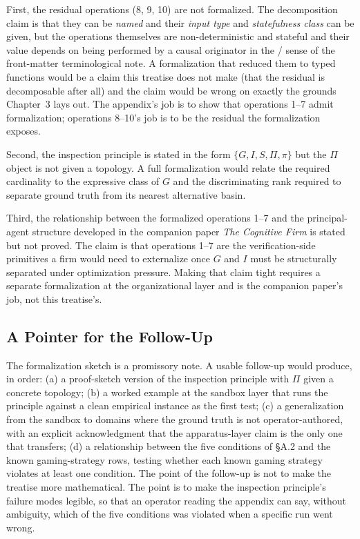 \documentclass[11pt]{article}
\begin{document}
First, the residual operations (8, 9, 10) are not formalized. The decomposition claim is that they can be \emph{named} and their \emph{input type} and \emph{statefulness class} can be given, but the operations themselves are non-deterministic and stateful and their value depends on being performed by a causal originator in the \citet{bandura1989} / \citet{ryan2000} sense of the front-matter terminological note. A formalization that reduced them to typed functions would be a claim this treatise does not make (that the residual is decomposable after all) and the claim would be wrong on exactly the grounds Chapter~3 lays out. The appendix's job is to show that operations 1--7 admit formalization; operations 8--10's job is to be the residual the formalization exposes.

Second, the inspection principle is stated in the form $\{G, I, S, \Pi, \pi\}$ but the $\Pi$ object is not given a topology. A full formalization would relate the required cardinality to the expressive class of $G$ and the discriminating rank required to separate ground truth from its nearest alternative basin.

Third, the relationship between the formalized operations 1--7 and the \citet{jensen1976} principal-agent structure developed in the companion paper \emph{The Cognitive Firm} is stated but not proved. The claim is that operations 1--7 are the verification-side primitives a firm would need to externalize once $G$ and $I$ must be structurally separated under optimization pressure. Making that claim tight requires a separate formalization at the organizational layer and is the companion paper's job, not this treatise's.

\subsection{A Pointer for the Follow-Up}

The formalization sketch is a promissory note. A usable follow-up would produce, in order: (a) a proof-sketch version of the inspection principle with $\Pi$ given a concrete topology; (b) a worked example at the sandbox layer that runs the principle against a clean empirical instance as the first test; (c) a generalization from the sandbox to domains where the ground truth is not operator-authored, with an explicit acknowledgment that the apparatus-layer claim is the only one that transfers; (d) a relationship between the five conditions of \S A.2 and the known gaming-strategy rows, testing whether each known gaming strategy violates at least one condition. The point of the follow-up is not to make the treatise more mathematical. The point is to make the inspection principle's failure modes legible, so that an operator reading the appendix can say, without ambiguity, which of the five conditions was violated when a specific run went wrong.
\end{document}
